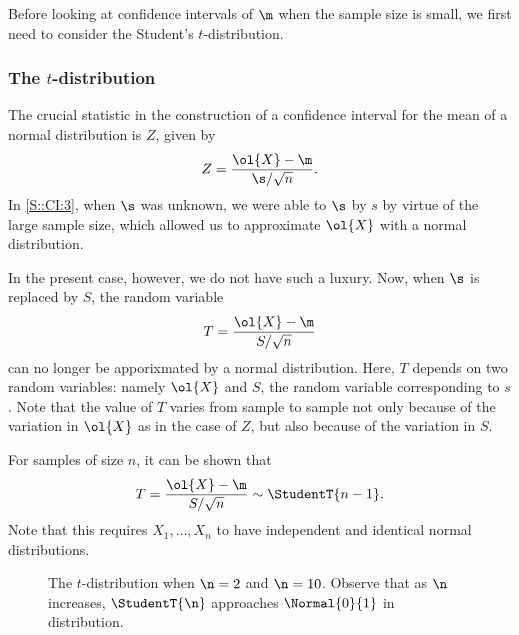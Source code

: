 Before looking at confidence intervals of $\m$ when the sample size is small, we first need to consider the Student's $t$-distribution.

\subsubsection{The $t$-distribution}

The crucial statistic in the construction of a confidence interval for the mean of a normal distribution is $Z$, given by \[Z = \frac{\ol{X} - \m}{\s/\sqrt{n}}.\] In \SS\ref{S::CI:3}, when $\s$ was unknown, we were able to $\s$ by $s$ by virtue of the large sample size, which allowed us to approximate $\ol{X}$ with a normal distribution.

In the present case, however, we do not have such a luxury. Now, when $\s$ is replaced by $S$, the random variable \[T = \frac{\ol{X} - \m}{S / \sqrt{n}}\] can no longer be apporixmated by a normal distribution. Here, $T$ depends on two random variables: namely $\ol{X}$ and $S$, the random variable corresponding to $s$. Note that the value of $T$ varies from sample to sample not only because of the variation in $\ol{X}$ as in the case of $Z$, but also because of the variation in $S$.

For samples of size $n$, it can be shown that \[T = \frac{\ol{X} - \m}{S / \sqrt{n}} \sim \StudentT{n - 1}.\] Note that this requires $X_1, \dots, X_n$ to have independent and identical normal distributions.

\begin{figure}[H]
    \centering
    \caption{The $t$-distribution when $\n = 2$ and $\n = 10$. Observe that as $\n$ increases, $\StudentT{\n}$ approaches $\Normal{0}{1}$ in distribution.}
\end{figure}

